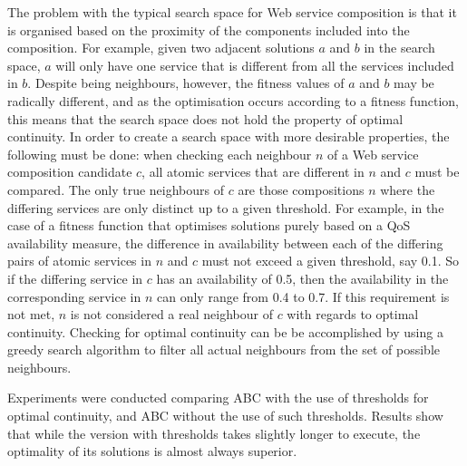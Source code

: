 The problem with the typical search space for Web service composition is that it is organised based on the proximity of the components included
into the composition. For example, given two adjacent solutions $a$ and $b$ in the search space, $a$ will only have one service that is different
from all the services included in $b$. Despite being neighbours, however, the fitness values of $a$ and $b$ may be radically different, and as
the optimisation occurs according to a fitness function, this means that the search space does not hold the property of optimal continuity.
In order to create a search space with more desirable properties, the following must be done: when checking each neighbour $n$ of a Web service
composition candidate $c$, all atomic services that are different in $n$ and $c$ must be compared. The only true neighbours of $c$ are those
compositions $n$ where the differing services are only distinct up to a given threshold. For example, in the case of a fitness function that optimises
solutions purely based on a QoS availability measure, the difference in availability between each of the differing pairs of atomic services in $n$ and $c$
must not exceed a given threshold, say 0.1. So if the differing service in $c$ has an availability of 0.5, then the availability in the corresponding service in $n$
can only range from 0.4 to 0.7. If this requirement is not met, $n$ is not considered a real neighbour of $c$ with regards to optimal continuity.
Checking for optimal continuity can be be accomplished by using a greedy search algorithm to filter all actual neighbours from the set of possible
neighbours.

Experiments were conducted comparing ABC with the use of thresholds for optimal continuity, and ABC without the use of such thresholds. Results
show that  while the version with thresholds takes slightly longer to execute, the optimality of its solutions is almost always superior.

